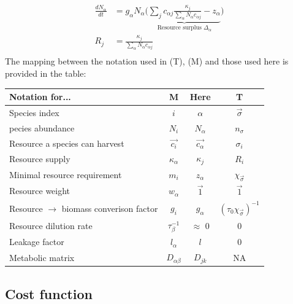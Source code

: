 \documentclass[12pt]{article}
\begin{document}
	        \begin{equation}\label{Tikhonov_model}
		        \begin{aligned}
					\frac{dN_{\alpha}}{dt} &= g_{\alpha}N_{\alpha}\Big(\underbrace{\sum_j c_{{\alpha}j}\frac{\kappa_j}{\sum_{\alpha}N_{\alpha}c_{{\alpha}j}} - z_{\alpha}}_{\text{Resource surplus }\Delta_{\alpha}}\Big)\\
					R_j &= \frac{\kappa_j}{\sum_{\alpha}N_{\alpha}c_{{\alpha}j}}\\
		        \end{aligned}
	        \end{equation} 
        	The mapping between the notation used in \cite{Tikhonov2016} (T), \cite{Marsland2019} (M) and those used here is provided in the table:\\
	        \begin{center}
		        \begin{tabular}{ |l|c|c|c| } 
            		\hline
            		Notation for... & M & Here & T \\ 
            		\hline
            		Species index & $ i $ & $ {\alpha} $ & $\vec{\sigma}$ \\ 
            		pecies abundance & $ N_i $ & $ N_{\alpha} $ & $ n_{\sigma} $ \\ 
            		Resource a species can harvest & $ \vec{c_{i}} $ & $ \vec{c_{{\alpha}}} $ & $ \sigma_i $ \\ 
            		Resource supply & $ \kappa_{\alpha}$ & $ \kappa_j $ & $ R_i $ \\ 
            		Minimal resource requirement & $ m_i $ & $ z_{\alpha} $ & $ \chi_{\vec{\sigma}} $ \\ 
            		Resource weight & $ w_{\alpha} $ & $ \vec{1} $ & $\vec{1}$ \\ 
            		Resource $ \rightarrow $ biomass converison factor & $ g_i $ & $ g_{\alpha} $ & $ (\tau_0\chi_{\vec{\sigma}})^{-1} $ \\ 
            		Resource dilution rate & $ \tau_{\beta}^{-1} $ & $ \approx $ 0 & 0 \\ 
            		Leakage factor & $ l_{\alpha} $ & $ l $ & 0 \\ 
            		Metabolic matrix & $ D_{\alpha\beta} $ & $ D_{jk} $ & NA \\ 
            		\hline
		        \end{tabular}
	        \end{center}
	        
	    \subsection{Cost function}\label{cost_function}
	        
\end{document}
